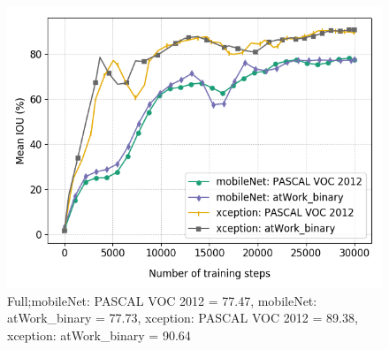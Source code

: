 \begin{figure}
	\includegraphics[scale=0.4]{images/transfer_full}
	\caption{Full;mobileNet: PASCAL VOC 2012 = 77.47, mobileNet: atWork\_binary = 77.73, xception: PASCAL VOC 2012 = 89.38, xception: atWork\_binary = 90.64}
\end{figure}

